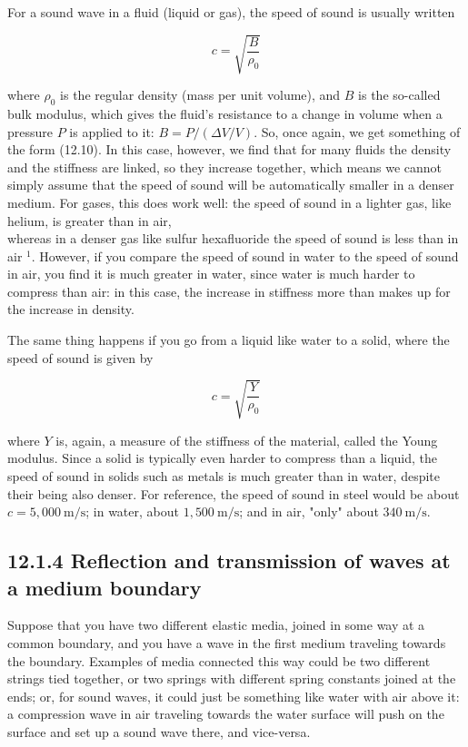 \documentclass[10pt]{article}
\begin{document}
For a sound wave in a fluid (liquid or gas), the speed of sound is usually written


\begin{equation*}
c=\sqrt{\frac{B}{\rho_{0}}} \tag{12.12}
\end{equation*}


where $\rho_{0}$ is the regular density (mass per unit volume), and $B$ is the so-called bulk modulus, which gives the fluid's resistance to a change in volume when a pressure $P$ is applied to it: $B=P /(\Delta V / V)$. So, once again, we get something of the form (12.10). In this case, however, we find that for many fluids the density and the stiffness are linked, so they increase together, which means we cannot simply assume that the speed of sound will be automatically smaller in a denser medium. For gases, this does work well: the speed of sound in a lighter gas, like helium, is greater than in air,\\
whereas in a denser gas like sulfur hexafluoride the speed of sound is less than in air ${ }^{1}$. However, if you compare the speed of sound in water to the speed of sound in air, you find it is much greater in water, since water is much harder to compress than air: in this case, the increase in stiffness more than makes up for the increase in density.

The same thing happens if you go from a liquid like water to a solid, where the speed of sound is given by


\begin{equation*}
c=\sqrt{\frac{Y}{\rho_{0}}} \tag{12.13}
\end{equation*}


where $Y$ is, again, a measure of the stiffness of the material, called the Young modulus. Since a solid is typically even harder to compress than a liquid, the speed of sound in solids such as metals is much greater than in water, despite their being also denser. For reference, the speed of sound in steel would be about $c=5,000 \mathrm{~m} / \mathrm{s}$; in water, about $1,500 \mathrm{~m} / \mathrm{s}$; and in air, "only" about $340 \mathrm{~m} / \mathrm{s}$.

\subsection*{12.1.4 Reflection and transmission of waves at a medium boundary}
Suppose that you have two different elastic media, joined in some way at a common boundary, and you have a wave in the first medium traveling towards the boundary. Examples of media connected this way could be two different strings tied together, or two springs with different spring constants joined at the ends; or, for sound waves, it could just be something like water with air above it: a compression wave in air traveling towards the water surface will push on the surface and set up a sound wave there, and vice-versa.
\end{document}
